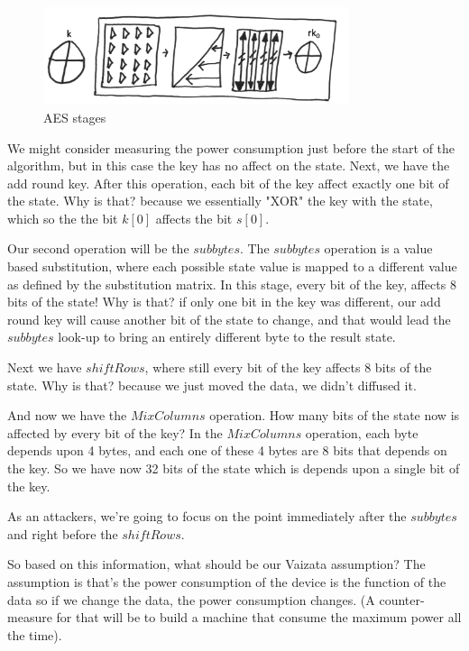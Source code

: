 \begin{figure}[H]
\centering
\includegraphics[width=0.8\textwidth]{images/Lecture6/AES-stages-figure.png}
\caption{AES stages}
\label{fig:aes-stages}
\end{figure}

We might consider measuring the power consumption just before the start of the algorithm, but in this case the key has no affect on the state. 
Next, we have the add round key. After this operation, each bit of the key affect exactly one bit of the state. Why is that? because we essentially "XOR" the key with the state, which so the the bit $k[0]$ affects the bit $s[0]$.

Our second operation will be the $subbytes$. The $subbytes$ operation is a value based substitution, where each possible state value is mapped to a different value as defined by the substitution matrix. In this stage, every bit of the key, affects 8 bits of the state! Why is that? if only one bit in the key was different, our add round key will cause another bit of the state to change, and that would lead the $subbytes$ look-up to bring an entirely different byte to the result state.

Next we have $shiftRows$, where still every bit of the key affects 8 bits of the state. Why is that? because we just moved the data, we didn't diffused it.

And now we have the $MixColumns$ operation. How many bits of the state now is affected by every bit of the key? In the $MixColumns$ operation, each byte depends upon 4 bytes, and each one of these 4 bytes are 8 bits that depends on the key. So we have now 32 bits of the state which is depends upon a single bit of the key.

As an attackers, we're going to focus on the point immediately after the $subbytes$ and right before the $shiftRows$. 

So based on this information, what should be our Vaizata assumption?
The assumption is that's the power consumption of the device is the function of the data so if we change the data, the power consumption changes. (A counter-measure for that will be to build a machine that consume the maximum power all the time).


